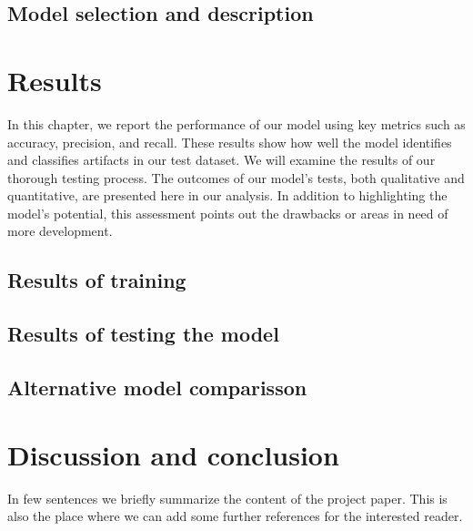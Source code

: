 \documentclass[12pt,a4paper,titlepage,openany]{report}
\begin{document}
\section{Model selection and description}


\chapter{Results}
\thispagestyle{fancy}

In this chapter, we report the performance of our model using key metrics such as accuracy, precision, and recall. These results show how well the model identifies and classifies artifacts in our test dataset.
We will examine the results of our thorough testing process. The outcomes of our model's tests, both qualitative and quantitative, are presented here in our analysis. In addition to highlighting the model's potential, this assessment points out the drawbacks or areas in need of more development.

\section{Results of training}

\section{Results of testing the model}

\section{Alternative model comparisson}




\chapter{Discussion and conclusion}
\thispagestyle{fancy}

In few sentences we briefly summarize the content of the project paper.
This is also the place where we can add some further references for the interested reader.

\end{document}
